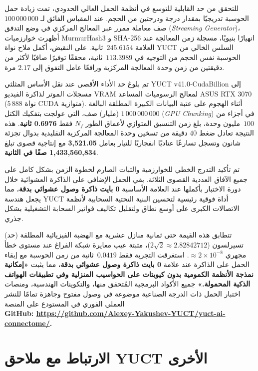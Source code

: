 \documentclass[12pt,a4paper]{article}
\begin{document}
	للتحقق من حد القابلية للتوسع في أنظمة الحمل العالي الحدودي، تمت زيادة حمل الحوسبة تدريجيًا بمقدار درجة ودرجتين من الحجم. عند المقياس الفائق لـ \(100\,000\,000\) صف معاملة ممرر عبر المعالج المركزي في وضع التدفق (\textit{Streaming Generator})، أظهرت خوارزميات MurmurHash3 و SHA‑256 انهيارًا بنيويًا، مسجلة زمن المعالجة عند العلامة \(245.6154\)~ثانية. على النقيض، أكمل ملاح نواة YUCT السلس الخالي من الحوسبة نفس الحجم من التوجيه في \(113.3989\)~ثانية، محققًا توفيرًا صافيًا لأكثر من دقيقتين من زمن وحدة المعالجة المركزية ورافعًا عامل التفوق إلى \(2.17\) مرة.
	
	تم بلوغ حد الأداء الأقصى عند نقل الأساس المثلثي YUCT v41.0‑CudaBillion إلى مسجلات الموتر لذاكرة الفيديو VRAM لمعالج الرسوميات المساعد ASUS RTX 3070 (\(5\,888\) نواة CUDA متوازية). أثناء الهجوم على عتبة البيانات الكبيرة المطلقة البالغة \(1\,000\,000\,000\) (مليار) صف، التي عولجت بتفكيك الكتل (\textit{GPU Chunking}) في أجزاء من \(100\)~مليون وحدة، بلغ زمن التنسيق المتوازي لأعماق الطور \(N_f\) فقط \textbf{0.6976 ثانية}. هذه النتيجة تعادل ضغط \(40\) دقيقة من تسخين وحدة المعالجة المركزية التقليدية بدوال تجزئة شانون وتسجل تسارعًا عتاديًا انفجاريًا للتيار بعامل \textbf{3,521.05} مع إنتاجية قصوى تبلغ \textbf{1,433,560,834 صفًا في الثانية}.
	
	تم تأكيد التدرج الخطي للخوارزمية والثبات الصارم لخطوة الزمن بشكل كامل على جميع الآفاق العددية القصوى الثلاثة. بقي الحمل الإضافي على الذاكرة العشوائية خلال دورة الاختبار بأكملها عند العلامة الأساسية \textbf{0 بايت ذاكرة وصول عشوائي بدقة}، مما يجعل هندسة YUCT أداة فوقية رئيسية لتحسين البنية التحتية السحابية لأنظمة الاتصالات الكبرى على أوسع نطاق ولتقليل تكاليف فواتير السحابة التشغيلية بشكل جذري.
	
	تتطابق هذه القيمة حتى ثمانية منازل عشرية مع الهضبة الفيزيائية المطلقة (حد) تسيرلسون (\(2\sqrt{2} \approx 2.82842712\))، مثبتة عيب معايرة شبكة الفراغ عند مستوى خطأ مجهري \(\approx 2 \times 10^{-8}\). استغرقت التجربة فقط \(0.0419\)~ثانية من زمن الحوسبة مع إبقاء الحمل على الذاكرة عند علامة \textbf{0 بايت ذاكرة وصول عشوائي بدقة}، مما يثبت \textbf{«إمكانية نمذجة الأنظمة الكمومية بدون كيوبتات على الحواسيب المنزلية وفي تطبيقات الهواتف الذكية المحمولة.»}
	جميع الأكواد البرمجية المُتحقق منها، والتكوينات الهندسية، ومنصات اختبار الحمل ذات الدرجة الصناعية موضوعة في وصول مفتوح وجاهزة تمامًا للنشر العملي الفوري في المستودع على المنصة \\
	\small \textbf{GitHub: \url{https://github.com/Alexey-Yakushev-YUCT/yuct-ai-connectome/}.}
	
	
	
	\section{الارتباط مع ملاحق YUCT الأخرى}
	
\end{document}
